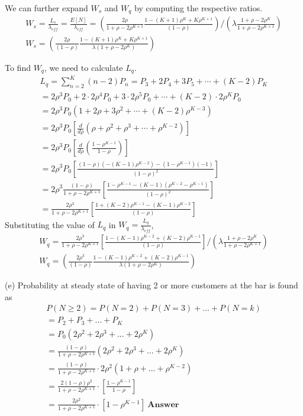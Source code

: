We can further expand $W_s$ and $W_q$ by computing the respective ratios.
\begin{gather*}
W_s = \frac{L_s}{\lambda_{eff}} =  \frac{E[N]}{\lambda_{eff}} = \left(\frac{2\rho}{1+\rho - 2\rho^{K+1}}\frac{1 - (K+1)\rho^K + K\rho^{K+1}}{(1-\rho)}\right) / \left(\lambda \frac{1 + \rho - 2\rho^{K}}{1 + \rho - 2\rho^{K+1}}\right)\\
W_s = \left(\frac{2\rho}{(1-\rho)}\frac{1 - (K+1)\rho^K + K\rho^{K+1}}{\lambda (1 + \rho - 2\rho^{K})}\right)
\end{gather*}

To find $W_q$, we need to calculate $L_q$.
\begin{gather*}
L_q = \sum_{n=2}^{K} (n-2)P_n = P_3 + 2P_4 + 3P_5 + \cdots + (K-2)P_K\\
= 2\rho^3P_0 + 2 \cdot 2\rho^4 P_0 + 3 \cdot 2\rho^5 P_0 + \cdots + (K-2)\cdot 2 \rho^K P_0\\
= 2\rho^3P_0(1 + 2\rho + 3 \rho^2 + \cdots + (K-2)\rho^{K-3})\\
= 2\rho^3P_0\left[\frac{d}{d\rho}(\rho + \rho^2 + \rho^3 + \cdots + \rho^{K-2})\right]\\
= 2\rho^3P_0\left[\frac{d}{d\rho}\left(\frac{1 - \rho^{K-1}}{1-\rho}\right)\right]\\
= 2\rho^3P_0\left[\frac{(1-\rho)(-(K-1)\rho^{K-2}) - (1-\rho^{K-1})(-1)}{(1-\rho)^2}\right]\\
= 2\rho^3\frac{(1 - \rho)}{1+\rho-2\rho^{K+1}}\left[\frac{1 - \rho^{K-1} - (K-1)(\rho^{K-2} - \rho^{K-1})}{(1-\rho)^2}\right]\\
= \frac{2\rho^3}{1+\rho-2\rho^{K+1}}\left[\frac{1 + (K-2)\rho^{K-1} - (K-1)\rho^{K-2}}{(1-\rho)}\right]
\end{gather*}
Substituting the value of $L_q$ in $W_q = \frac{L_q}{\lambda_{eff}}$,
\begin{gather*}
W_q = \frac{2\rho^3}{1+\rho-2\rho^{K+1}}\left[\frac{1 - (K-1)\rho^{K-2}+ (K-2)\rho^{K-1} }{(1-\rho)}\right]  / \left(\lambda \frac{1 + \rho - 2\rho^{K}}{1 + \rho - 2\rho^{K+1}}\right)\\
W_q = \left(\frac{2\rho^3}{(1-\rho)}\frac{1 - (K-1)\rho^{K-2}+ (K-2)\rho^{K-1} }{\lambda (1 + \rho - 2\rho^{K})}\right)
\end{gather*}

(e) Probability at steady state of having 2 or more customers at the bar is found as
\begin{gather*}
P(N\ge2) = P(N=2) + P(N=3) + ... + P(N=k)\\
=P_2 + P_3 + ... + P_K\\
=P_0(2\rho^2 + 2\rho^3 + ...+ 2\rho^K)\\
=\frac{(1-\rho)}{1 + \rho - 2\rho^{K+1}}(2\rho^2 + 2\rho^3 + ... + 2\rho^K)\\
=\frac{(1-\rho)}{1 + \rho - 2\rho^{K+1}}\cdot 2\rho^2(1 + \rho + ...+ \rho^{K-2})\\
=\frac{2(1-\rho)\rho^2}{1 + \rho - 2\rho^{K+1}}\cdot\left[\frac{1-\rho^{K-1}}{1-\rho}\right]\\
=\frac{2\rho^2}{1 + \rho - 2\rho^{K+1}}\cdot\left[1-\rho^{K-1}\right]\ \textbf{Answer}
\end{gather*}

